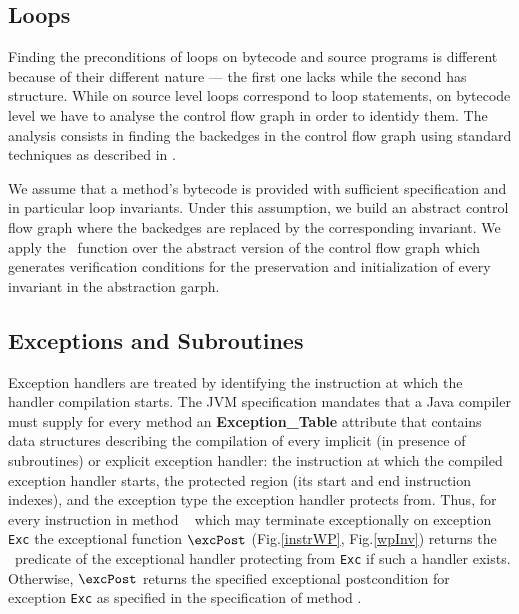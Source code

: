 \subsection{Loops}
Finding the preconditions of loops on bytecode and source programs is different because of their different nature --- 
the first one lacks while the second has structure. While on source level loops correspond to loop statements,  
on bytecode level we have to analyse the control flow graph in order to identidy them.
 The analysis consists in finding the backedges in the control flow graph using standard techniques as described in \cite{ARUCom1986}. 
  
 We assume that a method's bytecode is provided with sufficient specification and in particular loop invariants.
 Under this assumption, we build an abstract control flow graph where the backedges are replaced by
 the corresponding invariant. We apply the \wpi \ function over the abstract version of the control flow graph which generates verification conditions for the 
preservation and initialization of every invariant in the abstraction garph. 


     
\subsection{Exceptions and Subroutines}

Exception handlers are treated by identifying the instruction at which the handler compilation starts. The JVM specification mandates 
that a Java compiler must supply for every method an \textbf{Exception\_Table} attribute that contains data structures describing the compilation of
 every implicit (in presence of subroutines) or explicit exception handler: the instruction at which the compiled exception handler starts,
 the protected region (its start and end instruction indexes), and the exception type the exception handler protects from. Thus, 
for every instruction  in method \method~ which may terminate exceptionally on exception \texttt{Exc} the exceptional function
 $\excPost$ (Fig.\ref{instrWP}, Fig.\ref{wpInv}) returns the \wpi \ predicate of the exceptional handler protecting  from \texttt{Exc} if such a handler exists.
Otherwise, $\excPost$ returns the specified exceptional postcondition for exception \texttt{Exc} as specified in the specification of
method \method.

